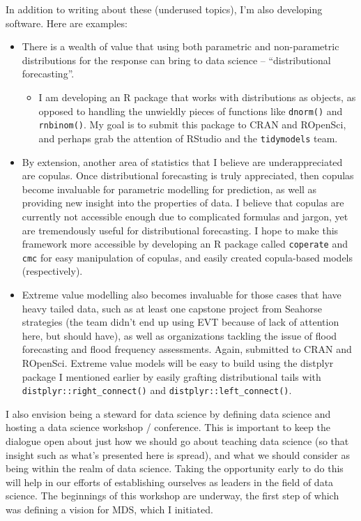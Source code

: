 \documentclass[]{article}
\providecommand{\tightlist}{%
  \setlength{\itemsep}{0pt}\setlength{\parskip}{0pt}}
\begin{document}
In addition to writing about these (underused topics), I'm also developing software. Here are examples:

\begin{itemize}
\tightlist
\item
  There is a wealth of value that using both parametric and non-parametric distributions for the response can bring to data science -- ``distributional forecasting''.

  \begin{itemize}
  \tightlist
  \item
    I am developing an R package that works with distributions as objects, as opposed to handling the unwieldly pieces of functions like \texttt{dnorm()} and \texttt{rnbinom()}. My goal is to submit this package to CRAN and ROpenSci, and perhaps grab the attention of RStudio and the \texttt{tidymodels} team.
  \end{itemize}
\item
  By extension, another area of statistics that I believe are underappreciated are copulas. Once distributional forecasting is truly appreciated, then copulas become invaluable for parametric modelling for prediction, as well as providing new insight into the properties of data. I believe that copulas are currently not accessible enough due to complicated formulas and jargon, yet are tremendously useful for distributional forecasting. I hope to make this framework more accessible by developing an R package called \texttt{coperate} and \texttt{cmc} for easy manipulation of copulas, and easily created copula-based models (respectively).
\item
  Extreme value modelling also becomes invaluable for those cases that have heavy tailed data, such as at least one capstone project from Seahorse strategies (the team didn't end up using EVT because of lack of attention here, but should have), as well as organizations tackling the issue of flood forecasting and flood frequency assessments. Again, submitted to CRAN and ROpenSci. Extreme value models will be easy to build using the distplyr package I mentioned earlier by easily grafting distributional tails with \texttt{distplyr::right\_connect()} and \texttt{distplyr::left\_connect()}.
\end{itemize}

I also envision being a steward for data science by defining data science and hosting a data science workshop / conference. This is important to keep the dialogue open about just how we should go about teaching data science (so that insight such as what's presented here is spread), and what we should consider as being within the realm of data science. Taking the opportunity early to do this will help in our efforts of establishing ourselves as leaders in the field of data science. The beginnings of this workshop are underway, the first step of which was defining a vision for MDS, which I initiated.
\end{document}

